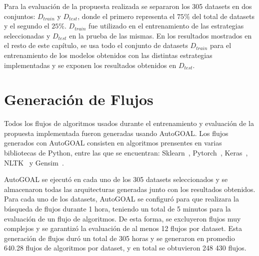  
 Para la evaluación de la propuesta realizada se separaron los 305 datasets en dos conjuntos: $D_{train}$ y $D_{test}$, donde el primero representa el $75\%$ del total de datasets y el segundo el $25\%$. $D_{train}$ fue utilizado en el entrenamiento de las estrategias seleccionadas y $D_{test}$ en la prueba de las mismas. %
 En los resultados mostrados en el resto de este capítulo, se usa todo el conjunto de datasets $D_{train}$ para el entrenamiento de los modelos obtenidos con las distintas estrategias implementadas y se exponen los resultados obtenidos en $D_{test}$.

 
 \section{Generación de Flujos}\label{sec:flujos}
 

Todos los flujos de algoritmos usados durante el entrenamiento y evaluación de la propuesta implementada fueron generadas usando AutoGOAL. Los flujos generados con AutoGOAL consisten en algoritmos prensentes en varias bibliotecas de Python, entre las que se encuentran: Sklearn~\cite{scikit-learn}, Pytorch~\cite{paszke2019pytorch}, Keras~\cite{chollet2015keras}, NLTK~\cite{bird2009natural} y Gensim~\cite{khosrovian2008gensim}.

AutoGOAL se ejecutó en cada uno de los 305 datasets seleccionados y se almacenaron todas las arquitecturas generadas junto con los resultados obtenidos. Para cada uno de los datasets, AutoGOAL se configuró para que realizara la búsqueda de flujos durante 1 hora, teniendo un total de 5 minutos para la evaluación de un flujo de algoritmos. De esta forma, se excluyeron flujos muy complejos y se garantizó la evaluación de al menos 12 flujos por dataset. Esta generación de flujos duró un total de 305 horas y se generaron en promedio 640.28 flujos de algoritmos por dataset, y en total se obtuvieron 248 430  flujos. 


